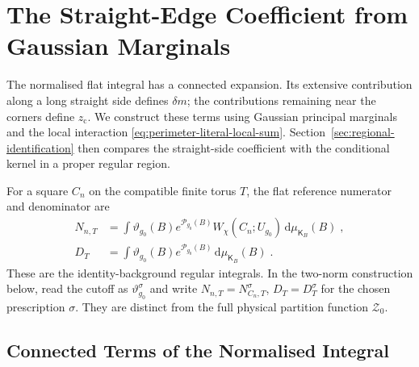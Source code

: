 \documentclass[11pt]{article}
\newcommand{\dd}{\mathrm{d}}
\begin{document}
\section{The Straight-Edge Coefficient from Gaussian Marginals}
\label{sec:marginal-perimeter}

The normalised flat integral has a connected expansion. Its extensive contribution along a long straight side defines $\delta m$; the contributions remaining near the corners define $z_{\mathrm c}$. We construct these terms using Gaussian principal marginals and the local interaction \eqref{eq:perimeter-literal-local-sum}. Section~\ref{sec:regional-identification} then compares the straight-side coefficient with the conditional kernel in a proper regular region.

For a square $C_n$ on the compatible finite torus $T$, the flat reference numerator and denominator are
\begin{equation}\label{eq:perimeter-native-integrals}
    \begin{aligned}
        N_{n,T}&=\int\vartheta_{g_0}(B)e^{\mathcal P_{g_0}(B)}
            W_\chi(C_n;U_{g_0})\,\dd\mu_{\mathsf K_B}(B)\;,\\
        D_T&=\int\vartheta_{g_0}(B)e^{\mathcal P_{g_0}(B)}
            \,\dd\mu_{\mathsf K_B}(B)\;.
    \end{aligned}
\end{equation}
These are the identity-background regular integrals. In the two-norm construction below, read the cutoff as $\vartheta_{g_0}^{\sigma}$ and write $N_{n,T}=N_{C_n,T}^{\sigma}$, $D_T=D_T^{\sigma}$ for the chosen prescription $\sigma$. They are distinct from the full physical partition function $\mathcal Z_0$.
\subsection{Connected Terms of the Normalised Integral}
\end{document}
